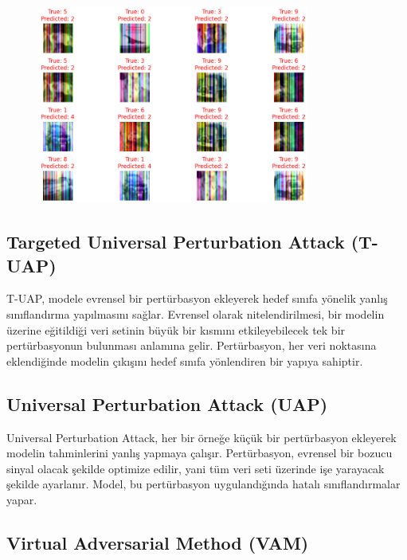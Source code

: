 \begin{figure}[h]
    \centering
    \includegraphics[width=0.8\textwidth]{images/square_attack_results.png}
    \caption{}
\end{figure}

\newpage

\subsection{Targeted Universal Perturbation Attack (T-UAP)}

T-UAP, modele evrensel bir pertürbasyon ekleyerek hedef sınıfa yönelik yanlış sınıflandırma yapılmasını sağlar. Evrensel olarak nitelendirilmesi, bir modelin üzerine eğitildiği veri setinin büyük bir kısmını etkileyebilecek tek bir pertürbasyonun bulunması anlamına gelir. Pertürbasyon, her veri noktasına eklendiğinde modelin çıkışını hedef sınıfa yönlendiren bir yapıya sahiptir.

\newpage

\subsection{Universal Perturbation Attack (UAP)}

Universal Perturbation Attack, her bir örneğe küçük bir pertürbasyon ekleyerek modelin tahminlerini yanlış yapmaya çalışır. Pertürbasyon, evrensel bir bozucu sinyal olacak şekilde optimize edilir, yani tüm veri seti üzerinde işe yarayacak şekilde ayarlanır. Model, bu pertürbasyon uygulandığında hatalı sınıflandırmalar yapar.

\newpage

\subsection{Virtual Adversarial Method (VAM)}

